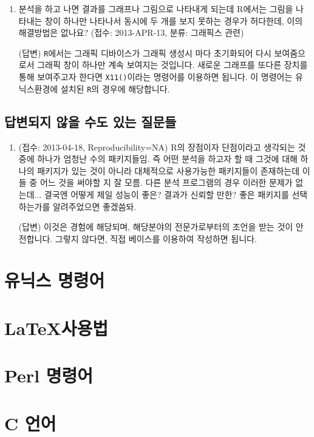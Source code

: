 \documentclass{report}
\begin{document}
\begin{enumerate}
	\item 분석을 하고 나면 결과를 그래프나 그림으로 나타내게 되는데 R에서는 그림을 나타내는 창이 하나만 나타나서 동시에 두 개를 보지 못하는 경우가 허다한데, 이의 해결방법은 없나요? (접수: 2013-APR-13, 분류: 그래픽스 관련) 
	
	\textsf{(답변)} \texttt{R}에서는 그래픽 디바이스가 그래픽 생성시 마다 초기화되어 다시 보여줌으로서 그래픽 창이 하나만 계속 보여지는 것입니다.  새로운 그래프를 또다른 장치를 통해 보여주고자 한다면 \texttt{X11()}이라는 명령어를 이용하면 됩니다.  
	이 명령어는 유닉스환경에 설치된 \texttt{R}의 경우에 해당합니다.  
	


\end{enumerate}


\section{답변되지 않을 수도 있는 질문들}

\begin{enumerate}
	\item (접수: 2013-04-18, Reproducibility=NA) R의 장점이자 단점이라고 생각되는 것 중에 하나가 엄청난 수의 패키지들임. 즉 어떤 분석을 하고자 할 때 그것에 대해 하나의 패키지가 있는 것이 아니라 대체적으로 사용가능한 패키지들이 존재하는데 이들 중 어느 것을 써야할 지 잘 모름. 다른 분석 프로그램의 경우 이러한 문제가 없는데... 결국엔 어떻게 제일 성능이 좋은? 결과가 신뢰할 만한? 좋은 패키지를 선택하는가를 알려주었으면 좋겠씀돠.
	
	\textsf{(답변)} 이것은 경험에 해당되며, 해당분야의 전문가로부터의 조언을 받는 것이 안전합니다.  그렇지 않다면, 직접 베이스를 이용하여 작성하면 됩니다. 
	
\end{enumerate}



\chapter{유닉스 명령어}

\chapter{\LaTeX 사용법}

\chapter{Perl 명령어}

\chapter{C 언어} 
\end{document}
